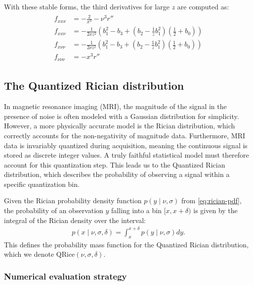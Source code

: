 \documentclass{article}
\begin{document}
With these stable forms, the third derivatives for large $z$ are computed as:
\begin{align}\label{eq:third-derivatives-large-z}
  \boxed{
    \begin{aligned}
      f_{xxx}       & = -\frac{2}{x^3} - \nu^3 r''                                                                      \\
      f_{xx\nu}     & = -\frac{1}{2 x z^2} \left( b_1^2 - b_3 + (b_2 - \frac{1}{z} b_1^2) (\frac{1}{2} + b_0) \right)   \\
      f_{x\nu\nu}   & = -\frac{1}{2 \nu z^2} \left( b_1^2 - b_3 + (b_2 - \frac{1}{z} b_1^2) (\frac{1}{2} + b_0) \right) \\
      f_{\nu\nu\nu} & = -x^3 r''
    \end{aligned}
  }
\end{align}

\subsection{The Quantized Rician distribution}

In magnetic resonance imaging (MRI), the magnitude of the signal in the presence of noise is often modeled with a Gaussian distribution for simplicity.
However, a more physically accurate model is the Rician distribution, which correctly accounts for the non-negativity of magnitude data.
Furthermore, MRI data is invariably quantized during acquisition, meaning the continuous signal is stored as discrete integer values.
A truly faithful statistical model must therefore account for this quantization step.
This leads us to the Quantized Rician distribution, which describes the probability of observing a signal within a specific quantization bin.

Given the Rician probability density function $p(y \mid \nu, \sigma)$ from \cref{eq:rician-pdf}, the probability of an observation $y$ falling into a bin $[x, x + \delta)$ is given by the integral of the Rician density over the interval:
%
\begin{align}\label{eq:quantized-rician-pmf}
  p(x \mid \nu, \sigma, \delta) = \int_x^{x + \delta} p(y \mid \nu, \sigma) dy.
\end{align}
%
This defines the probability mass function for the Quantized Rician distribution, which we denote $\mathrm{QRice}(\nu, \sigma, \delta)$.

\subsubsection{Numerical evaluation strategy}
\end{document}
